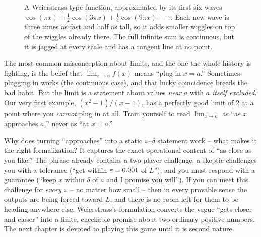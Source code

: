 \begin{figure}[htbp]
\centering
{}
\caption{A Weierstrass-type function, approximated by its first six waves
$\cos(\pi x) + \tfrac12\cos(3\pi x) + \tfrac14\cos(9\pi x) + \cdots$. Each new wave is three times
as fast and half as tall, so it adds smaller wiggles on top of the wiggles already there. The full
infinite sum is continuous, but it is jagged at every scale and has a tangent line at no point.}
\label{ch05:weierstrass}
\end{figure}

\begin{trapbox}
The most common misconception about limits, and the one the whole history is fighting, is the
belief that $\lim_{x\to a} f(x)$ means ``plug in $x=a$.'' Sometimes plugging in works (the
continuous case), and that lucky coincidence breeds the bad habit. But the limit is
a statement about values \emph{near} $a$ with $a$ \emph{itself excluded}. Our very first example,
$(x^2-1)/(x-1)$, has a perfectly good limit of $2$ at a point where you \emph{cannot} plug in
at all. Train yourself to read $\lim_{x\to a}$ as ``as $x$ approaches $a$,'' never as ``at
$x=a$.''
\end{trapbox}

\begin{whybox}
Why does turning ``approaches'' into a static $\varepsilon$--$\delta$ statement work -- what
makes it the right formalization? It captures the
exact operational content of ``as close as you like.'' The phrase already contains a two-player
challenge: a skeptic challenges you with a tolerance (``get within $\varepsilon = 0.001$ of $L$''), and you
must respond with a guarantee (``keep $x$ within $\delta$ of $a$ and I promise you will''). If you
can meet this challenge for \emph{every} $\varepsilon$ -- no matter how small -- then in
every provable sense the outputs are being forced toward $L$, and there is no
room left for them to be heading anywhere else. Weierstrass's formulation
converts the vague ``gets closer and closer'' into a finite, checkable promise about two
ordinary positive numbers. The next chapter is devoted to playing this game until it is
second nature.
\end{whybox}

